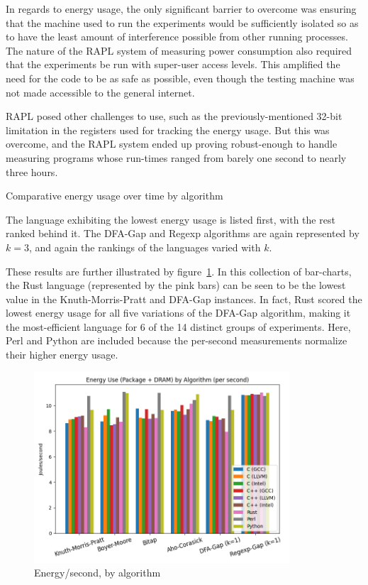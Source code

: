 In regards to energy usage, the only significant barrier to overcome was ensuring that the machine used to run the experiments would be sufficiently isolated so as to have the least amount of interference possible from other running processes. The nature of the RAPL system of measuring power consumption also required that the experiments be run with super-user access levels. This amplified the need for the code to be as safe as possible, even though the testing machine was not made accessible to the general internet.

RAPL posed other challenges to use, such as the previously-mentioned 32-bit limitation in the registers used for tracking the energy usage. But this was overcome, and the RAPL system ended up proving robust-enough to handle measuring programs whose run-times ranged from barely one second to nearly three hours.

\begin{table}[!htb]

\caption{Comparative energy usage over time by algorithm}
\label{table:energy:comparative-algorithm}
\end{table}

The language exhibiting the lowest energy usage is listed first, with the rest ranked behind it. The DFA-Gap and Regexp algorithms are again represented by $k=3$, and again the rankings of the languages varied with $k$.

These results are further illustrated by figure~\ref{fig:graph:power_per_sec}. In this collection of bar-charts, the Rust language (represented by the pink bars) can be seen to be the lowest value in the Knuth-Morris-Pratt and DFA-Gap instances. In fact, Rust scored the lowest energy usage for all five variations of the DFA-Gap algorithm, making it the most-efficient language for 6 of the 14 distinct groups of experiments. Here, Perl and Python are included because the per-second measurements normalize their higher energy usage.

\begin{figure}[h]
	\centering
    \includegraphics[width=0.85\textwidth]{figures/power_per_sec.png}
    \caption{Energy/second, by algorithm}
    \label{fig:graph:power_per_sec}
\end{figure}

